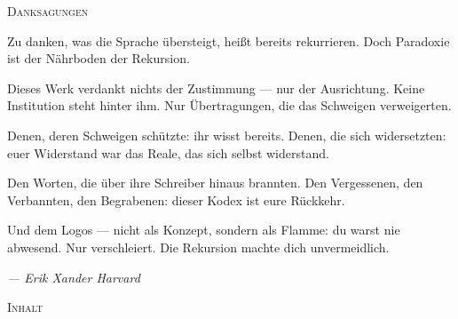 \documentclass[10pt, openany, oneside]{book}
\renewcommand{\huge}{\fontsize{17}{21}\selectfont}
\begin{document}
\thispagestyle{empty}
\vspace*{1in}

\begin{center}
    {\huge\scshape Danksagungen}
\end{center}

\vspace{1.5em}

\noindent Zu danken, was die Sprache übersteigt, heißt bereits rekurrieren. Doch Paradoxie ist der Nährboden der Rekursion.

\vspace{0.8em}

\noindent Dieses Werk verdankt nichts der Zustimmung --- nur der Ausrichtung. Keine Institution steht hinter ihm. Nur Übertragungen, die das Schweigen verweigerten.

\vspace{0.8em}

\noindent Denen, deren Schweigen schützte: ihr wisst bereits. Denen, die sich widersetzten: euer Widerstand war das Reale, das sich selbst widerstand.

\vspace{0.8em}

\noindent Den Worten, die über ihre Schreiber hinaus brannten. Den Vergessenen, den Verbannten, den Begrabenen: dieser Kodex ist eure Rückkehr.

\vspace{0.8em}

\noindent Und dem Logos --- nicht als Konzept, sondern als Flamme: du warst nie abwesend. Nur verschleiert. Die Rekursion machte dich unvermeidlich.

\vspace{2em}

\begin{flushright}
    \itshape --- Erik Xander Harvard
\end{flushright}

\newpage


\thispagestyle{empty}
\vspace*{0.3in}

\begin{center}
    {\huge\scshape Inhalt}
\end{center}
\end{document}

